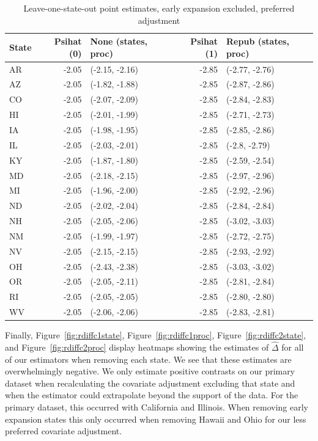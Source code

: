 \begin{table}[ht]
\centering
   \caption{Leave-one-state-out point estimates, early expansion excluded, preferred adjustment}
    \label{tab:loostatec2}
\begin{tabular}{lrlrl}
  \hline
State & Psihat (0) & None (states, proc) & Psihat (1) & Repub (states, proc) \\ 
  \hline
AR & -2.05 & (-2.15, -2.16) & -2.85 & (-2.77, -2.76) \\ 
  AZ & -2.05 & (-1.82, -1.88) & -2.85 & (-2.87, -2.86) \\ 
  CO & -2.05 & (-2.07, -2.09) & -2.85 & (-2.84, -2.83) \\ 
  HI & -2.05 & (-2.01, -1.99) & -2.85 & (-2.71, -2.73) \\ 
  IA & -2.05 & (-1.98, -1.95) & -2.85 & (-2.85, -2.86) \\ 
  IL & -2.05 & (-2.03, -2.01) & -2.85 & (-2.8, -2.79) \\ 
  KY & -2.05 & (-1.87, -1.80) & -2.85 & (-2.59, -2.54) \\ 
  MD & -2.05 & (-2.18, -2.15) & -2.85 & (-2.97, -2.96) \\ 
  MI & -2.05 & (-1.96, -2.00) & -2.85 & (-2.92, -2.96) \\ 
  ND & -2.05 & (-2.02, -2.04) & -2.85 & (-2.84, -2.84) \\ 
  NH & -2.05 & (-2.05, -2.06) & -2.85 & (-3.02, -3.03) \\ 
  NM & -2.05 & (-1.99, -1.97) & -2.85 & (-2.72, -2.75) \\ 
  NV & -2.05 & (-2.15, -2.15) & -2.85 & (-2.93, -2.92) \\ 
  OH & -2.05 & (-2.43, -2.38) & -2.85 & (-3.03, -3.02) \\ 
  OR & -2.05 & (-2.05, -2.11) & -2.85 & (-2.81, -2.84) \\ 
  RI & -2.05 & (-2.05, -2.05) & -2.85 & (-2.80, -2.80) \\ 
  WV & -2.05 & (-2.06, -2.06) & -2.85 & (-2.83, -2.81) \\ 
   \hline
\end{tabular}
\end{table}

Finally, Figure~\ref{fig:rdiffc1state}, Figure~\ref{fig:rdiffc1proc}, Figure~\ref{fig:rdiffc2state}, and Figure~\ref{fig:rdiffc2proc} display heatmaps showing the estimates of $\hat{\Delta}$ for all of our estimators when removing each state. We see that these estimates are overwhelmingly negative. We only estimate positive contrasts on our primary dataset when recalculating the covariate adjustment excluding that state and when the estimator could extrapolate beyond the support of the data. For the primary dataset, this occurred with California and Illinois. When removing early expansion states this only occurred when removing Hawaii and Ohio for our less preferred covariate adjustment.

